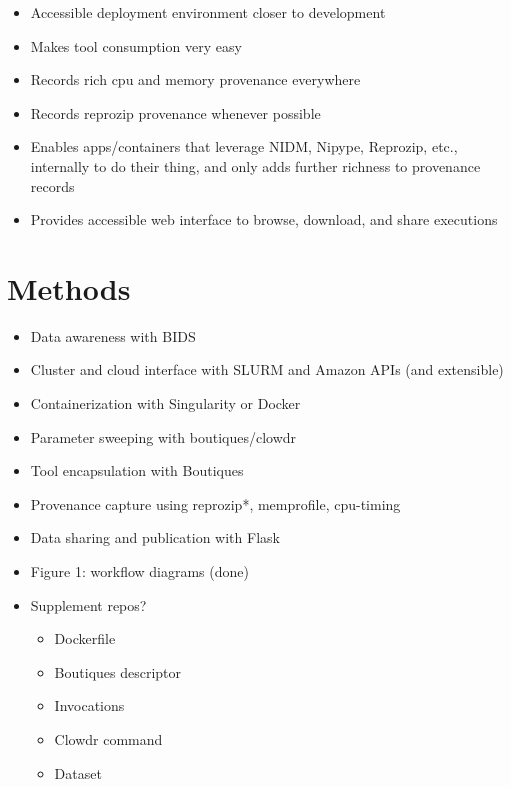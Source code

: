 \documentclass[9pt,twocolumn,twoside]{pnas-new}
\begin{document}
\begin{itemize}
\begin{itemize}
\item Accessible deployment environment closer to development
\item Makes tool consumption very easy
\item Records rich cpu and memory provenance everywhere
\item Records reprozip provenance whenever possible
\item Enables apps/containers that leverage NIDM, Nipype, Reprozip, etc., internally to do their thing, and only adds further richness to provenance records
\item Provides accessible web interface to browse, download, and share executions
\end{itemize}
\end{itemize}

\section*{Methods}
\begin{itemize}
\item Data awareness with BIDS
\item Cluster and cloud interface with SLURM and Amazon APIs (and extensible)
\item Containerization with Singularity or Docker
\item Parameter sweeping with boutiques/clowdr
\item Tool encapsulation with Boutiques
\item Provenance capture using reprozip*, memprofile, cpu-timing
\item Data sharing and publication with Flask
\item Figure 1: workflow diagrams (done)
\item Supplement repos?
\begin{itemize}
\item Dockerfile
\item Boutiques descriptor
\item Invocations
\item Clowdr command
\item Dataset
\end{itemize}
\end{itemize}
\end{document}
